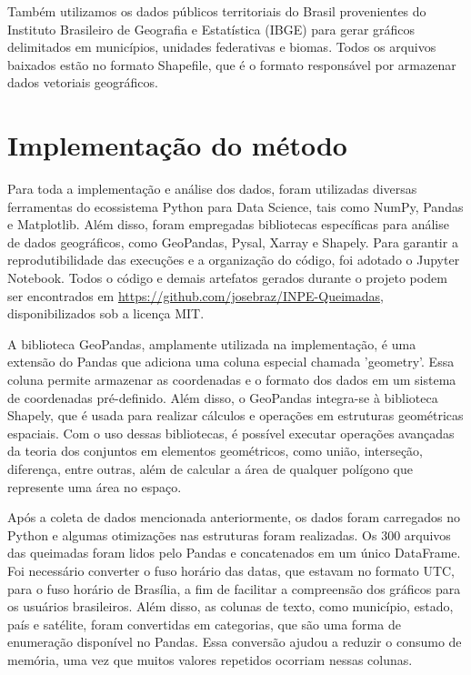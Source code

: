 \documentclass[cic,tc]{iiufrgs}
\begin{document}
Também utilizamos os dados públicos territoriais do Brasil provenientes do Instituto Brasileiro de Geografia e Estatística (IBGE) para gerar gráficos delimitados em municípios, unidades federativas e biomas. Todos os arquivos baixados estão no formato Shapefile, que é o formato responsável por armazenar dados vetoriais geográficos.


\section{Implementação do método}

Para toda a implementação e análise dos dados, foram utilizadas diversas ferramentas do ecossistema Python para Data Science, tais como NumPy, Pandas e Matplotlib. Além disso, foram empregadas bibliotecas específicas para análise de dados geográficos, como GeoPandas, Pysal, Xarray e Shapely. Para garantir a reprodutibilidade das execuções e a organização do código, foi adotado o Jupyter Notebook. Todos o código e demais artefatos gerados durante o projeto podem ser encontrados em \url{https://github.com/josebraz/INPE-Queimadas}, disponibilizados sob a licença MIT. \par

A biblioteca GeoPandas, amplamente utilizada na implementação, é uma extensão do Pandas que adiciona uma coluna especial chamada 'geometry'. Essa coluna permite armazenar as coordenadas e o formato dos dados em um sistema de coordenadas pré-definido. Além disso, o GeoPandas integra-se à biblioteca Shapely, que é usada para realizar cálculos e operações em estruturas geométricas espaciais. Com o uso dessas bibliotecas, é possível executar operações avançadas da teoria dos conjuntos em elementos geométricos, como união, interseção, diferença, entre outras, além de calcular a área de qualquer polígono que represente uma área no espaço. \par

Após a coleta de dados mencionada anteriormente, os dados foram carregados no Python e algumas otimizações nas estruturas foram realizadas. Os 300 arquivos das queimadas foram lidos pelo Pandas e concatenados em um único DataFrame. Foi necessário converter o fuso horário das datas, que estavam no formato UTC, para o fuso horário de Brasília, a fim de facilitar a compreensão dos gráficos para os usuários brasileiros. Além disso, as colunas de texto, como município, estado, país e satélite, foram convertidas em categorias, que são uma forma de enumeração disponível no Pandas. Essa conversão ajudou a reduzir o consumo de memória, uma vez que muitos valores repetidos ocorriam nessas colunas. \par
\end{document}
